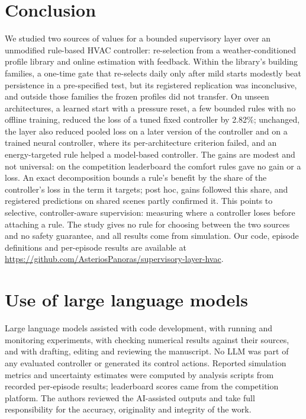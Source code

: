 \documentclass{article}
\begin{document}
\section{Conclusion}\label{sec:conclusion}
We studied two sources of values for a bounded supervisory layer over an unmodified rule-based HVAC
controller: re-selection from a weather-conditioned profile library and online estimation with feedback.
Within the library's building families, a one-time gate that re-selects daily only after mild starts modestly
beat persistence in a pre-specified test, but its registered replication was inconclusive, and outside those
families the frozen profiles did not transfer. On unseen architectures, a learned start with a pressure reset,
a few bounded rules with no offline training, reduced the loss of a tuned fixed controller by 2.82\%;
unchanged, the layer also reduced pooled loss on a later version of the controller and on a trained neural
controller, where its per-architecture criterion failed, and an energy-targeted rule helped a model-based
controller. The gains are modest and not universal: on the competition leaderboard the comfort rules gave no
gain or a loss. An exact decomposition bounds a rule's benefit by the share of the controller's loss in the
term it targets; post hoc, gains followed this share, and registered predictions on shared scenes partly
confirmed it. This points to selective, controller-aware supervision: measuring where a controller loses
before attaching a rule. The study gives no rule for choosing between the two sources and no safety guarantee,
and all results come from simulation. Our code, episode definitions and per-episode results are available at
\mbox{\url{https://github.com/AsteriosPanoras/supervisory-layer-hvac}}.





\appendix
\section*{Use of large language models}
Large language models assisted with code development, with running and monitoring experiments, with checking numerical
results against their sources, and with drafting, editing and reviewing the manuscript. No LLM was part of any
evaluated controller or generated its control actions. Reported simulation metrics and uncertainty estimates were computed by
analysis scripts from recorded per-episode results; leaderboard scores came from the competition platform. The authors
reviewed the AI-assisted outputs and take full responsibility for the accuracy, originality and integrity of the work.


\end{document}
